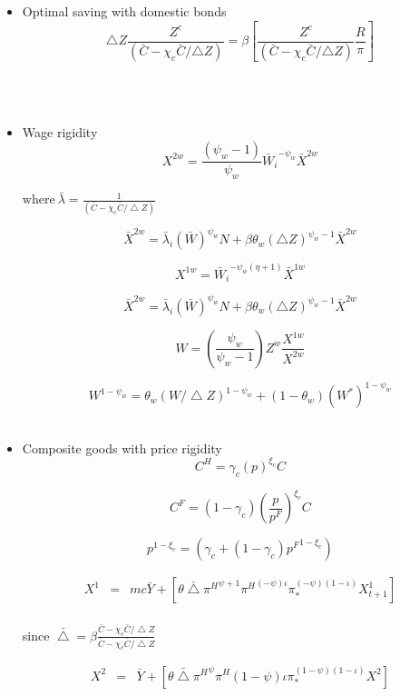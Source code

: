 \documentclass[11pt, a4paper]{article}
\begin{document}
\small
\begin{itemize}
\item Optimal saving with domestic bonds
\[\bigtriangleup Z\frac{Z^c}{(\bar{C} - \chi_c \bar{C}/{\bigtriangleup Z})} = \beta \left[ \frac{Z^c}{(\bar{C} - \chi_c \bar{C}/{\bigtriangleup Z})} \frac{R}{\pi} \right] \] 

~\\~

\item Wage rigidity
 \[  X^{2w} =\frac{(\psi_w-1)}{\psi_w} {\bar{W}_{i}}^{-\psi_w} \bar{X}^{2w} \]

$\text{where} ~\bar{\lambda}= \frac{1}{ (\bar{C}-\chi_c {\bar{C}}/\bigtriangleup Z)}$ 

\[ \bar{X}^{2w} =  {{\bar{\lambda}_{i}}  \left({\bar{W}} \right)^{\psi_w} N} + \beta \theta_w { \left({\bigtriangleup Z}\right)^{\psi_w-1}} \bar{X}^{2w} \]
  
 \[  X^{1w} ={\bar{W}_{i}}^{-\psi_w(\eta +1)} \bar{X}^{1w} \]

\[ \bar{X}^{2w} =  {{\bar{\lambda}_{i}}  \left({\bar{W}} \right)^{\psi_w} N} + \beta \theta_w { \left({\bigtriangleup Z}\right)^{\psi_w-1}} \bar{X}^{2w} \]
  
 \[W = \left(\frac{\psi_w}{\psi_w -1}\right) Z^w \frac{X^{1w}}{X^{2w}}\]
 
 \[ W^{1-\psi_w} = \theta_w (W/\bigtriangleup Z)^{1-\psi_w} + (1-\theta_w)(W^*)^{1-\psi_w}\]
 ~\\

 \item Composite goods with price rigidity
 \[C^H = \gamma_c (p)^{\xi_c} C  \]
 
  \[C^F = (1-\gamma_c) \left(\frac{p}{p^F}\right)^{\xi_c} C  \]
 
 \[p^{1-\xi_c} = \left(\gamma_c + (1-\gamma_c){p^F}^{1-\xi_c}\right) \]


\begin{eqnarray*} X^1 &=&  mc \bar{Y} + \left[\theta \bar{\bigtriangleup}  {\pi^H}^{\psi +1} {\pi^H}^{(-\psi)\iota} \pi_*^{{(-\psi)}(1-\iota) } X_{t+1}^1 \right] \end{eqnarray*} 
\\
since $\bar{\bigtriangleup} = \beta \frac{\bar{C} - \chi_c \bar{C}/\bigtriangleup Z}{\bar{C} - \chi_c \bar{C}/\bigtriangleup Z}$ 

\begin{eqnarray*} X^2 &=&  \bar{Y} +  \left[\theta \bar{\bigtriangleup}  {\pi^H}^{\psi} {\pi^H}{(1-\psi)\iota} \pi_*^{{(1-\psi)}(1-\iota) }  X^2 \right]
\end{eqnarray*} 


\end{itemize}
\end{document}
